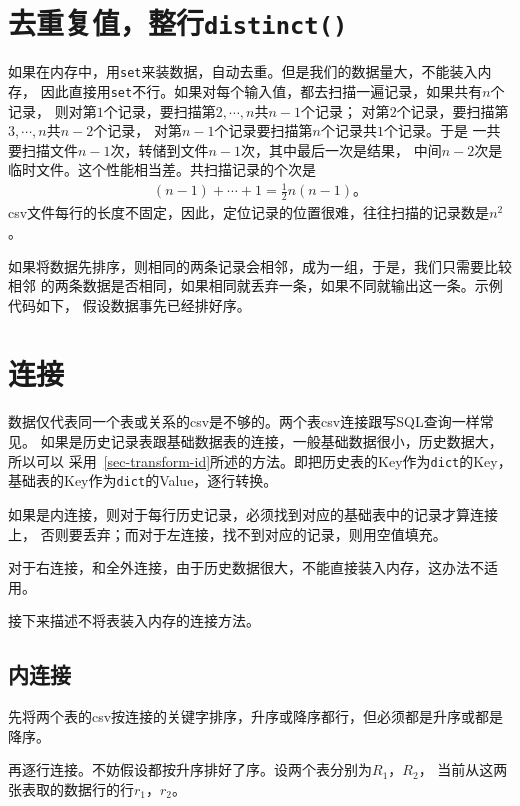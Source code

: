 \documentclass[11pt]{article}
\newcommand{\id}[1]{\texttt{#1}}
\begin{document}
\section{去重复值，整行\id{distinct()}}
如果在内存中，用\id{set}来装数据，自动去重。但是我们的数据量大，不能装入内存，
因此直接用\id{set}不行。如果对每个输入值，都去扫描一遍记录，如果共有$n$个记录，
则对第$1$个记录，要扫描第$2, \cdots, n$共$n-1$个记录；
对第$2$个记录，要扫描第$3, \cdots, n$共$n-2$个记录，
对第$n-1$个记录要扫描第$n$个记录共$1$个记录。于是
一共要扫描文件$n-1$次，转储到文件$n-1$次，其中最后一次是结果，
中间$n-2$次是临时文件。这个性能相当差。共扫描记录的个次是
\begin{equation} \label{scan-identical}
\begin{aligned}
(n-1) + \cdots + 1 = \frac{1}{2} n (n-1)\text{。} 
\end{aligned} 
\end{equation}
csv文件每行的长度不固定，因此，定位记录的位置很难，往往扫描的记录数是$n^2$。

如果将数据先排序，则相同的两条记录会相邻，成为一组，于是，我们只需要比较相邻
的两条数据是否相同，如果相同就丢弃一条，如果不同就输出这一条。示例代码如下，
假设数据事先已经排好序。


\section{连接}
数据仅代表同一个表或关系的csv是不够的。两个表csv连接跟写SQL查询一样常见。
如果是历史记录表跟基础数据表的连接，一般基础数据很小，历史数据大，所以可以
采用~\ref{sec-transform-id}所述的方法。即把历史表的Key作为\id{dict}的Key，
基础表的Key作为\id{dict}的Value，逐行转换。

如果是内连接，则对于每行历史记录，必须找到对应的基础表中的记录才算连接上，
否则要丢弃；而对于左连接，找不到对应的记录，则用空值填充。

对于右连接，和全外连接，由于历史数据很大，不能直接装入内存，这办法不适用。

接下来描述不将表装入内存的连接方法。

\subsection{内连接} \label{sec-inner-join}
先将两个表的csv按连接的关键字排序，升序或降序都行，但必须都是升序或都是降序。

再逐行连接。不妨假设都按升序排好了序。设两个表分别为$R_1$，$R_2$，
当前从这两张表取的数据行的行$r_1$，$r_2$。
\end{document}
